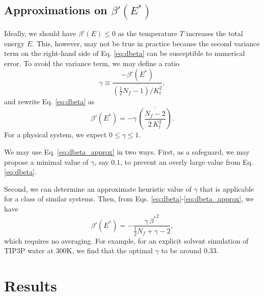 \documentclass[reprint]{revtex4-1}
\begin{document}
\subsection{\label{sec:dbetadE}
Approximations on $\beta'(E^*)$}


Ideally, we should have $\beta'(E) \le 0$
as the temperature $T$ increases the total energy $E$.
%
This, however, may not be true in practice
because the second variance term on the right-hand side
of Eq. \eqref{eq:dbeta}
can be susceptible to numerical error.
%
%
To avoid the variance term,
we may define a ratio
%
\begin{equation}
  \gamma
  \equiv
  \frac
  {
    -\beta'(E^*)
  }
  {
    \overline{
      \left( \frac 1 2 N_f - 1  \right) / K_t^2
    }
  }
  ,
  \label{eq:gamma_def}
\end{equation}
%
and rewrite Eq. \eqref{eq:dbeta} as
%
\begin{equation}
  \beta'(E^*)
  =
  -\gamma \, \overline{
    \left(
      \frac{ N_f - 2 }
           { 2 \, K_t^2 }
    \right)
    }
  .
  \label{eq:dbeta_approx}
\end{equation}
%
For a physical system, we expect $0 \le \gamma \le 1$.
%

We may use Eq. \eqref{eq:dbeta_approx} in two ways.
%
First, as a safeguard,
we may propose a minimal value of $\gamma$, say $0.1$,
to prevent an overly large value from Eq. \eqref{eq:dbeta}.

Second,
we can determine an approximate heuristic value of $\gamma$
that is applicable for a class of similar systems.
%
Then,
from Eqs. \eqref{eq:dbeta}-\eqref{eq:dbeta_approx},
we have
%
\begin{equation}
  \beta'(E^*)
  =
  -\frac{ \gamma \, {\beta^*}^2 }
  { \frac{1}{2} N_f + \gamma - 2 }
  ,
  \label{eq:dbeta_approx2}
\end{equation}
%
which requires no averaging.
%
For example,
for an explicit solvent simulation of TIP3P water\cite{jorgensen1983}
at 300K, we find that the optimal $\gamma$
to be around $0.33$.



\section{Results}
\end{document}
